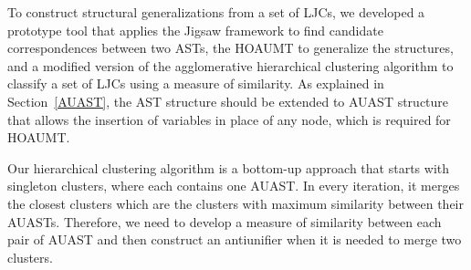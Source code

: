 
To construct structural generalizations from a set of LJCs, we developed a prototype tool that applies the Jigsaw framework to find candidate correspondences between two ASTs, the HOAUMT to generalize the structures, and a modified version of the agglomerative hierarchical clustering algorithm to classify a set of LJCs using a measure of similarity. As explained in Section~\ref{AUAST}, the AST structure should be extended to AUAST structure that allows the insertion of variables in place of any node, which is required for HOAUMT.


Our hierarchical clustering algorithm is a bottom-up approach that starts with singleton clusters, where each contains one AUAST. In every iteration, it merges the closest clusters which are the clusters with maximum similarity between their AUASTs. Therefore, we need to develop a measure of similarity between each pair of AUAST and then construct an antiunifier when it is needed to merge two clusters.

